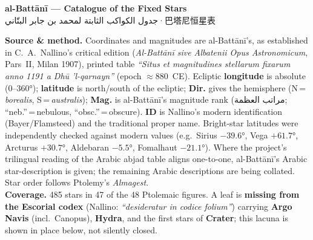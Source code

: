 \documentclass[9pt,a4paper]{extarticle}
\newcommand{\ar}[1]{{\arabicfont\textarabic{#1}}}
\begin{document}
\begin{center}
{\LARGE\bfseries al-Battānī — Catalogue of the Fixed Stars}\\[2pt]
{\large \ar{جدول الكواكب الثابتة لمحمد بن جابر البتّاني}\quad·\quad 巴塔尼恒星表}\\[6pt]
\end{center}
\small
\noindent\textbf{Source \& method.} Coordinates and magnitudes are al-Battānī's, as
established in C.~A.~Nallino's critical edition (\textit{Al-Battānī sive Albatenii Opus
Astronomicum}, Pars~II, Milan 1907), printed table \textit{``Situs et magnitudines
stellarum fixarum anno 1191 a Dhū 'l-qarnayn''} (epoch $\approx$880~CE). Ecliptic
\textbf{longitude} is absolute (0--360°); \textbf{latitude} is north/south of the
ecliptic; \textbf{Dir.} gives the hemisphere (N\,=\,\textit{borealis}, S\,=\,\textit{australis});
\textbf{Mag.} is al-Battānī's magnitude rank (\ar{مراتب العظمة}; ``neb.''\,=\,nebulous,
``obsc.''\,=\,obscure). \textbf{ID} is Nallino's modern identification (Bayer/Flamsteed)
and the traditional proper name. Bright-star latitudes were independently checked against
modern values (e.g.\ Sirius $-39.6°$, Vega $+61.7°$, Arcturus $+30.7°$, Aldebaran $-5.5°$,
Fomalhaut $-21.1°$). Where the project's trilingual reading of the Arabic abjad table
aligns one-to-one, al-Battānī's Arabic star-description is given; the remaining Arabic
descriptions are being collated. Star order follows Ptolemy's \textit{Almagest}.\\[4pt]
\noindent\textbf{Coverage.} 485 stars in 47 of the 48 Ptolemaic figures. A leaf is
\textbf{missing from the Escorial codex} (Nallino: \textit{``desideratur in codice
folium''}) carrying \textbf{Argo Navis} (incl.\ Canopus), \textbf{Hydra}, and the first
stars of \textbf{Crater}; this lacuna is shown in place below, not silently closed.
\vspace{4pt}
\end{document}
